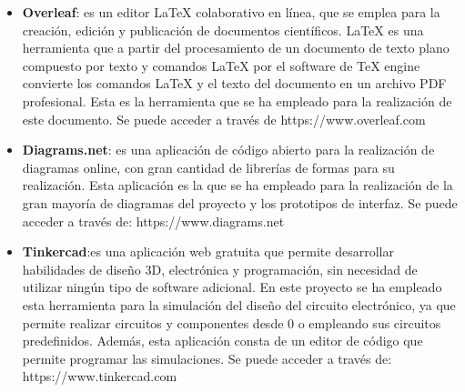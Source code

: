\begin{itemize}
\item \textbf{Overleaf}: es un editor LaTeX colaborativo en línea, que se emplea para la creación, edición y publicación de documentos científicos. LaTeX es una herramienta que a partir del procesamiento de un documento de texto plano compuesto por texto y comandos LaTeX por el software de TeX engine convierte los comandos LaTeX y el texto del documento en un archivo PDF profesional. Esta es la herramienta que se ha empleado para la realización de este documento. Se puede acceder a través de https://www.overleaf.com  %

\item \textbf{Diagrams.net}: es una aplicación de código abierto para la realización de diagramas online, con gran cantidad de librerías de formas para su realización. Esta aplicación es la que se ha empleado para la realización de la gran mayoría de diagramas del proyecto y los prototipos de interfaz. Se puede acceder a través de: https://www.diagrams.net %

\item \textbf{Tinkercad}:es una aplicación web gratuita que permite desarrollar habilidades de diseño 3D, electrónica y programación, sin necesidad de utilizar ningún tipo de software adicional. En este proyecto se ha empleado esta herramienta para la simulación del diseño del circuito electrónico, ya que permite realizar circuitos y componentes desde 0 o empleando sus circuitos predefinidos. Además, esta aplicación consta de un editor de código que permite programar las simulaciones. Se puede acceder a través de: https://www.tinkercad.com %

\end{itemize}

